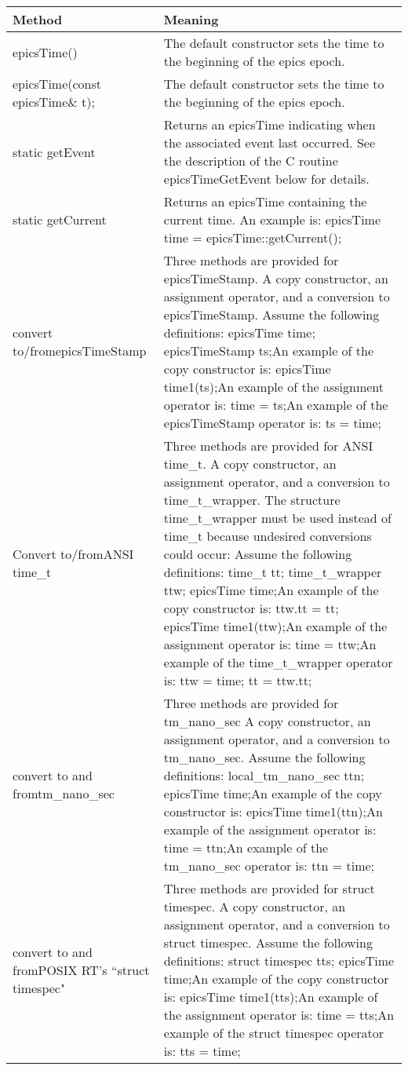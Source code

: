 \begin{center}
\begin{longtable}{p{1.95833in}p{4.79167in}}
\textbf{Method} & \textbf{Meaning}\\
\hline
epicsTime() & The default constructor sets the time to the beginning of the epics epoch.\\
epicsTime(const epicsTime\& t); & The default constructor sets the time to the beginning of the epics epoch.\\
static getEvent & Returns an epicsTime indicating when the associated event last occurred. See the description of the C routine epicsTimeGetEvent below for details.\\
static getCurrent & Returns an epicsTime containing the current time. An example is:    epicsTime time = epicsTime::getCurrent();\\
convert to/fromepicsTimeStamp & Three methods are provided for epicsTimeStamp. A copy constructor, an assignment operator, and a conversion to epicsTimeStamp. Assume the following definitions:    epicsTime time;    epicsTimeStamp ts;An example of the copy constructor is:    epicsTime time1(ts);An example of the assignment operator is:    time = ts;An example of the epicsTimeStamp operator is:    ts = time;\\
Convert to/fromANSI time\_t & Three methods are provided for ANSI time\_t. A copy constructor, an assignment operator, and a conversion to time\_t\_wrapper. The structure time\_t\_wrapper must be used instead of time\_t because undesired conversions could occur: Assume the following definitions:    time\_t tt;    time\_t\_wrapper ttw;    epicsTime time;An example of the copy constructor is:    ttw.tt = tt;    epicsTime time1(ttw);An example of the assignment operator is:    time = ttw;An example of the time\_t\_wrapper operator is:    ttw = time;    tt = ttw.tt;\\
convert to and fromtm\_nano\_sec & Three methods are provided for tm\_nano\_sec A copy constructor, an assignment operator, and a conversion to tm\_nano\_sec. Assume the following definitions:    local\_tm\_nano\_sec ttn;    epicsTime time;An example of the copy constructor is:    epicsTime time1(ttn);An example of the assignment operator is:    time = ttn;An example of the tm\_nano\_sec operator is:    ttn = time;\\
convert to and fromPOSIX RT's ``struct timespec" & Three methods are provided for struct timespec. A copy constructor, an assignment operator, and a conversion to struct timespec. Assume the following definitions:    struct timespec tts;    epicsTime time;An example of the copy constructor is:    epicsTime time1(tts);An example of the assignment operator is:    time = tts;An example of the struct timespec operator is:    tts = time;\\

\end{longtable}
\end{center}
